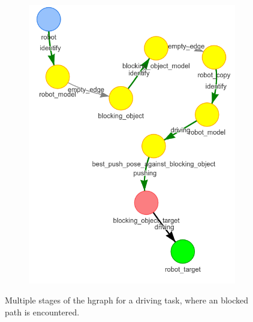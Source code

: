 \begin{figure}[H]
\begin{subfigure}{.3\textwidth}
    \caption{}\label{subfig:blocking_obj_5}
    \end{subfigure}
    \begin{subfigure}{.3\textwidth}
    \centering
    \includegraphics[width=\textwidth]{figures/proposed_method/connecting_nodes/blocking_obj/blocking_obj_6}
    \caption{}\label{subfig:blocking_obj_6}
    \end{subfigure}
    \caption{Multiple stages of the \ac{hgraph} for a driving task, where an blocked path is encountered.}%
    \label{fig:blocking_obj_hgraph}
\end{figure}


